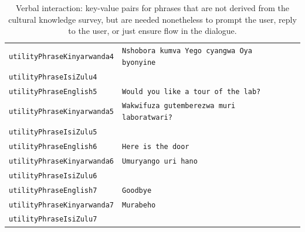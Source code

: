 \documentclass{CSSRforAfrica}
\begin{document}
\begin{table}[H]
\begin{center}
\begin{tabular}{|l l l|}
{\footnotesize \verb+utilityPhraseKinyarwanda4+}     & {\footnotesize \verb+Nshobora kumva Yego cyangwa Oya byonyine+}\vspace{-1mm} & {\footnotesize  } \\
{\footnotesize \verb+utilityPhraseIsiZulu4+}              & {\footnotesize \verb++}\vspace{-1mm} & {\footnotesize  } \\
{\footnotesize \verb+utilityPhraseEnglish5+}             & {\footnotesize \verb+Would you like a tour of the lab?+}\vspace{-1mm} & {\footnotesize  } \\
{\footnotesize \verb+utilityPhraseKinyarwanda5+}     & {\footnotesize \verb+Wakwifuza gutemberezwa muri laboratwari?+}\vspace{-1mm} & {\footnotesize  } \\
{\footnotesize \verb+utilityPhraseIsiZulu5+}              & {\footnotesize \verb++}\vspace{-1mm} & {\footnotesize  } \\
{\footnotesize \verb+utilityPhraseEnglish6+}             & {\footnotesize \verb+Here is the door+}\vspace{-1mm} & {\footnotesize  } \\
{\footnotesize \verb+utilityPhraseKinyarwanda6+}     & {\footnotesize \verb+Umuryango uri hano+}\vspace{-1mm} & {\footnotesize  } \\
{\footnotesize \verb+utilityPhraseIsiZulu6+}              & {\footnotesize \verb++}\vspace{-1mm} & {\footnotesize  } \\
{\footnotesize \verb+utilityPhraseEnglish7+}             & {\footnotesize \verb+Goodbye+}\vspace{-1mm} & {\footnotesize  } \\
{\footnotesize \verb+utilityPhraseKinyarwanda7+}     & {\footnotesize \verb+Murabeho+}\vspace{-1mm} & {\footnotesize  } \\
{\footnotesize \verb+utilityPhraseIsiZulu7+}              & {\footnotesize \verb++}\vspace{-1mm} & {\footnotesize  } \\
\hline \hline
\end{tabular}
\end{center}
\caption{Verbal interaction: key-value pairs for phrases that are not derived from the cultural knowledge survey, but are needed nonetheless to prompt the user, reply to the user, or just ensure flow in the dialogue.}
\label{table:key-value_pairs4}
\end{table}
 
\end{document}
